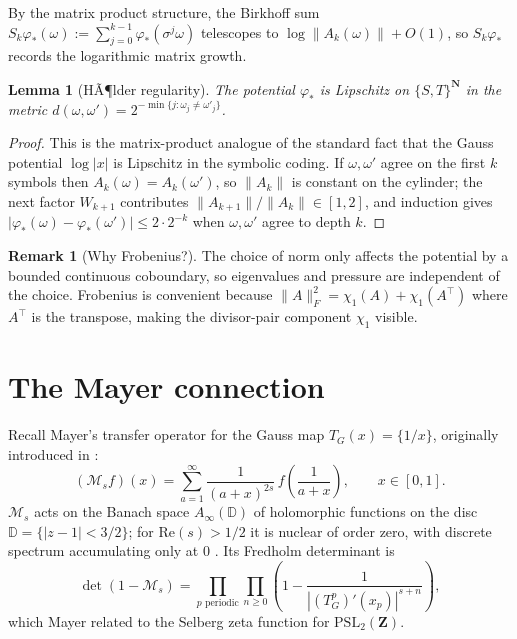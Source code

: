 ﻿\documentclass[11pt]{article}
\newtheorem{lemma}[theorem]{Lemma}
\theoremstyle{definition}
\newtheorem{remark}[theorem]{Remark}
\newcommand{\N}{\mathbf{N}}
\newcommand{\Z}{\mathbf{Z}}
\begin{document}
By the matrix product structure, the Birkhoff sum $S_k\varphi_*(\omega):=\sum_{j=0}^{k-1}\varphi_*(\sigma^j\omega)$ telescopes to $\log\|A_k(\omega)\|+O(1)$, so $S_k\varphi_*$ records the logarithmic matrix growth.

\begin{lemma}[HÃ¶lder regularity]\label{lem:holder}
The potential $\varphi_*$ is Lipschitz on $\{S,T\}^\N$ in the metric $d(\omega,\omega')=2^{-\min\{j:\omega_j\ne\omega'_j\}}$.
\end{lemma}

\begin{proof}
This is the matrix-product analogue of the standard fact that the Gauss potential $\log|x|$ is Lipschitz in the symbolic coding. If $\omega,\omega'$ agree on the first $k$ symbols then $A_k(\omega)=A_k(\omega')$, so $\|A_k\|$ is constant on the cylinder; the next factor $W_{k+1}$ contributes $\|A_{k+1}\|/\|A_k\|\in[1,2]$, and induction gives $|\varphi_*(\omega)-\varphi_*(\omega')|\le 2\cdot 2^{-k}$ when $\omega,\omega'$ agree to depth $k$.
\end{proof}

\begin{remark}[Why Frobenius?]
The choice of norm only affects the potential by a bounded continuous coboundary, so eigenvalues and pressure are independent of the choice. Frobenius is convenient because $\|A\|_F^2=\chi_1(A)+\chi_1(A^\top)$ where $A^\top$ is the transpose, making the divisor-pair component $\chi_1$ visible.
\end{remark}

\section{The Mayer connection}\label{sec:mayer}

Recall Mayer's transfer operator for the Gauss map $T_G(x)=\{1/x\}$, originally introduced in \cite{mayer}:
\begin{equation}\label{eq:mayer}
(\mathcal{M}_s f)(x) = \sum_{a=1}^\infty \frac{1}{(a+x)^{2s}}\,f\!\left(\frac{1}{a+x}\right),\qquad x\in[0,1].
\end{equation}
$\mathcal{M}_s$ acts on the Banach space $A_\infty(\mathbb{D})$ of holomorphic functions on the disc $\mathbb{D}=\{|z-1|<3/2\}$; for $\mathrm{Re}(s)>1/2$ it is nuclear of order zero, with discrete spectrum accumulating only at $0$ \cite{mayer-roepstorff,pollicott-vytnova}. Its Fredholm determinant is
\[
\det(1-\mathcal{M}_s) = \prod_{p\text{ periodic}}\prod_{n\ge 0}\left(1-\frac{1}{|(T_G^p)'(x_p)|^{s+n}}\right),
\]
which Mayer related to the Selberg zeta function for $\mathrm{PSL}_2(\Z)$.
\end{document}
